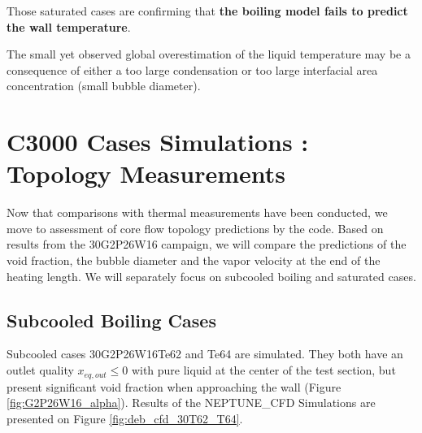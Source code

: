 \npar

Those saturated cases are confirming that \textbf{the boiling model fails to predict the wall temperature}. 


\begin{remark*}{}
The small yet observed global overestimation of the liquid temperature may be a consequence of either a too large condensation or too large interfacial area concentration (\ie small bubble diameter). 
\end{remark*}




\section{C3000 Cases Simulations : Topology Measurements}
\label{sec:deb_cfd_c30}

Now that comparisons with thermal measurements have been conducted, we move to assessment of core flow topology predictions by the code. Based on results from the 30G2P26W16 campaign, we will compare the predictions of the void fraction, the bubble diameter and the vapor velocity at the end of the heating length. We will separately focus on subcooled boiling and saturated cases.


\subsection{Subcooled Boiling Cases}

Subcooled cases 30G2P26W16Te62 and Te64 are simulated. They both have an outlet quality $x_{eq,out} \leq 0$ with pure liquid at the center of the test section, but present significant void fraction when approaching the wall (Figure \ref{fig:G2P26W16_alpha}). Results of the NEPTUNE\_CFD Simulations are presented on Figure \ref{fig:deb_cfd_30T62_T64}.

